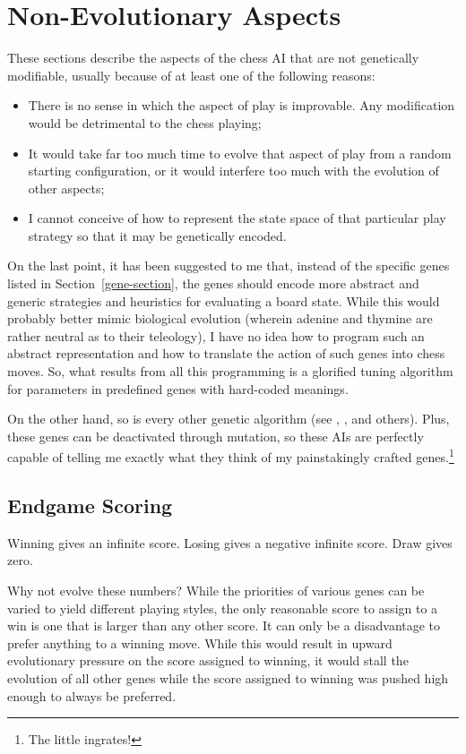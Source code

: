 \documentclass[letterpaper]{article}
\renewcommand\_{\textunderscore\allowbreak}
\begin{document}
\section{Non-Evolutionary Aspects}

These sections describe the aspects of the chess AI that are not genetically modifiable, usually because of at least one of the following reasons:
\begin{itemize}
	\item There is no sense in which the aspect of play is improvable. Any modification would be detrimental to the chess playing;
	\item It would take far too much time to evolve that aspect of play from a random starting configuration, or it would interfere too much with the evolution of other aspects;
	\item I cannot conceive of how to represent the state space of that particular play strategy so that it may be genetically encoded.
\end{itemize}
On the last point, it has been suggested to me that, instead of the specific genes listed in Section~\ref{gene-section}, the genes should encode more abstract and generic strategies and heuristics for evaluating a board state. While this would probably better mimic biological evolution (wherein adenine and thymine are rather neutral as to their teleology), I have no idea how to program such an abstract representation and how to translate the action of such genes into chess moves. So, what results from all this programming is a glorified tuning algorithm for parameters in predefined genes with hard-coded meanings.

On the other hand, so is every other genetic algorithm (see \cite{evolved-antenna}, \cite{evolved-stellarator}, and others). Plus, these genes can be deactivated through mutation, so these AIs are perfectly capable of telling me exactly what they think of my painstakingly crafted genes.\footnote{The little ingrates!}

\subsection{Endgame Scoring}

Winning gives an infinite score.
Losing gives a negative infinite score.
Draw gives zero.

Why not evolve these numbers? While the priorities of various genes can be varied to yield different playing styles, the only reasonable score to assign to a win is one that is larger than any other score. It can only be a disadvantage to prefer anything to a winning move. While this would result in upward evolutionary pressure on the score assigned to winning, it would stall the evolution of all other genes while the score assigned to winning was pushed high enough to always be preferred.
\end{document}
